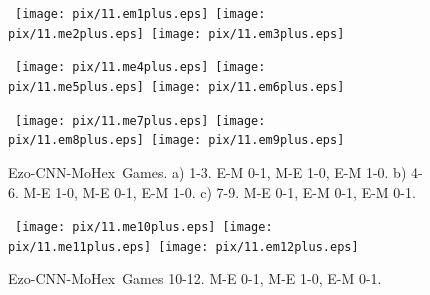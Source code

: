 \documentclass{IOS-Book-Article}
\newif\iflong\longtrue  %
\def\Ec{\mbox{\sc Ezo-CNN}}
\def\Mx{\mbox{\sc MoHex}}
\begin{document}
\begin{figure}
\hspace*{-2cm}\
\texttt{[image: pix/11.em1plus.eps]}\hspace*{-1.5cm}\
\texttt{[image: pix/11.me2plus.eps]}\hspace*{-1.5cm}\
\texttt{[image: pix/11.em3plus.eps]}
\smallskip

\hspace*{-2cm}\
\texttt{[image: pix/11.me4plus.eps]}\hspace*{-1.5cm}\
\texttt{[image: pix/11.me5plus.eps]}\hspace*{-1.5cm}\
\texttt{[image: pix/11.em6plus.eps]}
\smallskip

\hspace*{-2cm}\
\texttt{[image: pix/11.me7plus.eps]}\hspace*{-1.5cm}\
\texttt{[image: pix/11.em8plus.eps]}\hspace*{-1.5cm}\
\texttt{[image: pix/11.em9plus.eps]}
\caption{\Ec-\Mx\ Games.
a) 1-3. E-M 0-1, M-E 1-0, E-M 1-0.
b) 4-6. M-E 1-0, M-E 0-1, E-M 1-0.
c) 7-9. M-E 0-1, E-M 0-1, E-M 0-1.}
\label{fig:EM11}
\end{figure}

\begin{figure}
\hspace*{-2cm}\
\texttt{[image: pix/11.me10plus.eps]}\hspace*{-1.5cm}\
\texttt{[image: pix/11.me11plus.eps]}\hspace*{-1.5cm}\
\texttt{[image: pix/11.em12plus.eps]}
\caption{\Ec-\Mx\ Games 10-12. M-E 0-1, M-E 1-0, E-M 0-1.}
\end{figure}
\iflong

\end{document}
